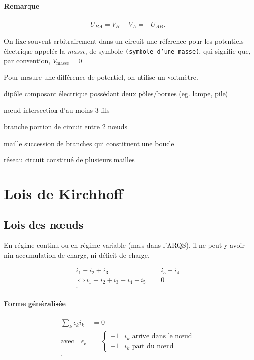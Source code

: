 \documentclass{article}
\newenvironment{definition}{\begin{description}[leftmargin=!,labelwidth=\widthof{\bfseries Lorem ipsum dolor}]}{\end{description}}
\begin{document}
\paragraph{Remarque}
\begin{align*}
	U_{BA} = V_B - V_A = -U_{AB}
.\end{align*}

On fixe souvent arbitrairement dans un circuit une référence pour les potentiels électrique appelée la \emph{masse}, de symbole \texttt{(symbole d'une masse)}, qui signifie que, par convention, $V_{\text{masse}} = 0$

Pour mesure une différence de potentiel, on utilise un voltmètre.

\begin{definition}
	\item[dipôle] composant électrique possédant deux pôles/bornes (eg. lampe, pile)
	\item[nœud] intersection d'au moins 3 fils
	\item[branche] portion de circuit entre 2 nœuds
	\item[maille] succession de branches qui constituent une boucle
	\item[réseau] circuit constitué de plusieurs mailles
\end{definition}

\section{Lois de Kirchhoff}
\subsection{Lois des nœuds}
En régime continu ou en régime variable (mais dans l'ARQS), il ne peut y avoir nin accumulation de charge, ni déficit de charge.


\begin{align*}
	i_1+i_2+i_3&=i_5+i_4 \\
	\iff i_1 + i_2 + i_3 - i_4 - i_5 &= 0 \\
.\end{align*}


\paragraph{Forme généralisée}
\begin{align*}
	\sum_{k}^{} \epsilon_k i_k &= 0 \\
	\text{avec}\quad \epsilon_k &= \begin{cases}
		+1 &\text{$i_k$ arrive dans le nœud} \\
		-1 &\text{$i_k$ part du nœud}
	\end{cases} \\
.\end{align*}
\end{document}
